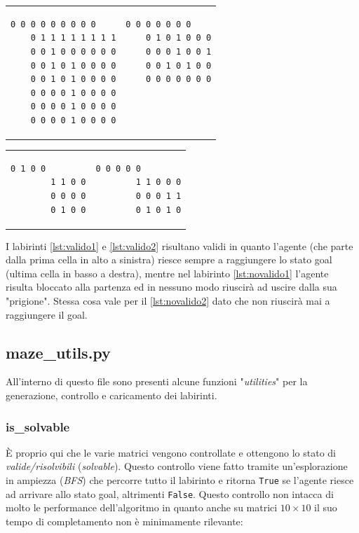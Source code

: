 \begin{tabular}{m{20em}  m{20em}}
\begin{lstlisting}[style=python, caption={Labirinto 8x9 valido}, label={lst:valido1}]
	0 0 0 0 0 0 0 0 0
	0 1 1 1 1 1 1 1 1
	0 0 1 0 0 0 0 0 0
	0 0 1 0 1 0 0 0 0
	0 0 1 0 1 0 0 0 0
	0 0 0 0 1 0 0 0 0
	0 0 0 0 1 0 0 0 0
	0 0 0 0 1 0 0 0 0
\end{lstlisting}
&
\begin{lstlisting}[style=python, caption={Labirinto 5x7 valido}, label={lst:valido2}]
	0 0 0 0 0 0 0
	0 1 0 1 0 0 0
	0 0 0 1 0 0 1
	0 0 1 0 1 0 0
	0 0 0 0 0 0 0
	
	
	
\end{lstlisting}
\end{tabular}

\begin{tabular}{m{20em}  m{20em}}
	\begin{lstlisting}[style=python, caption={Labirinto 4x4 NON valido}, label={lst:novalido1}]
		0 1 0 0
		1 1 0 0
		0 0 0 0
		0 1 0 0
	\end{lstlisting}
	&
	\begin{lstlisting}[style=python, caption={Labirinto 4x5 NON valido}, label={lst:novalido2}]
		0 0 0 0 0
		1 1 0 0 0
		0 0 0 1 1
		0 1 0 1 0
	\end{lstlisting}
\end{tabular}

I labirinti \ref{lst:valido1} e \ref{lst:valido2} risultano validi in quanto l'agente (che parte dalla prima cella in alto a sinistra) riesce sempre a raggiungere lo stato goal (ultima cella in basso a destra), mentre nel labirinto \ref{lst:novalido1} l'agente risulta bloccato alla partenza ed in nessuno modo riuscir\`{a} ad uscire dalla sua "prigione". Stessa cosa vale per il \ref{lst:novalido2} dato che non riuscir\`{a} mai a raggiungere il goal.

\subsection{maze\_utils.py}
All'interno di questo file sono presenti alcune funzioni "\textit{utilities}" per la generazione, controllo e caricamento dei labirinti. 

\subsubsection{is\_solvable}
\`{E} proprio qui che le varie matrici vengono controllate e ottengono lo stato di \textit{valide/risolvibili} (\textit{solvable}).  %
Questo controllo viene fatto tramite un'esplorazione in ampiezza (\textit{BFS}) che percorre tutto il labirinto e ritorna \lstinline[style=cmd]|True| se l'agente riesce ad arrivare allo stato goal, altrimenti \lstinline[style=cmd]|False|. Questo controllo non intacca di molto le performance dell'algoritmo in quanto anche su matrici $10 \times 10$ il suo tempo di completamento non \`{e} minimamente rilevante: %

